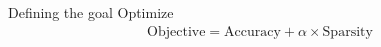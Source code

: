 \documentclass[xcolor={dvipsnames}]{beamer}
\begin{document}
\begin{frame}{Defining the goal}
Optimize
\begin{align*}
\text{Objective} = \text{Accuracy} + \alpha \times \text{Sparsity}
\end{align*}
\end{frame}

\begin{frame}{Neural Network architecture}

\centering
\texttt{[image: \{neural\_network]}.pdf}

\end{frame}

\makelastslide
\end{document}
